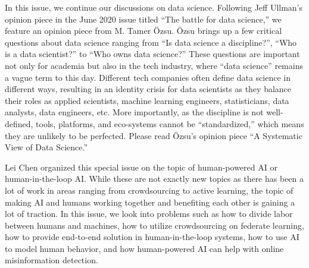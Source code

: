 \documentclass[11pt]{article}
\begin{document}
In this issue, we continue our discussions on data science. Following
Jeff Ullman's opinion piece in the June 2020 issue titled ``The battle
for data science,'' we feature an opinion piece from M. Tamer
\"{O}zsu. \"{O}zsu brings up a few critical questions about data
science ranging from ``Is data science a discipline?'', ``Who is a
data scientist?'' to ``Who owns data science?'' These questions are
important not only for academia but also in the tech industry, where
``data science'' remains a vague term to this day. Different tech
companies often define data science in different ways, resulting in an
identity crisis for data scientists as they balance their roles as
applied scientists, machine learning engineers, statisticians, data
analysts, data engineers, etc. More importantly, as the discipline is
not well-defined, tools, platforms, and eco-systems cannot be
``standardized,'' which means they are unlikely to be
perfected. Please read \"{O}zsu's opinion piece ``A Systematic View of
Data Science.''

Lei Chen organized this special issue on the topic of human-powered AI
or human-in-the-loop AI. While these are not exactly new topics as
there has been a lot of work in areas ranging from crowdsourcing to
active learning, the topic of making AI and humans working together
and benefiting each other is gaining a lot of traction. In this issue,
we look into problems such as how to divide labor between humans and
machines, how to utilize crowdsourcing on federate learning, how to
provide end-to-end solution in human-in-the-loop systems, how to use
AI to model human behavior, and how human-powered AI can help with
online misinformation detection.
\end{document}
